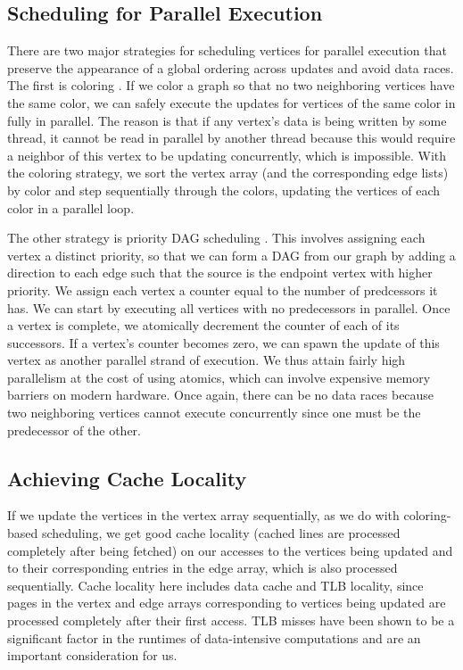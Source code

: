 \documentclass[journal]{IEEEtran}
\begin{document}
\subsection{Scheduling for Parallel Execution}
There are two major strategies for scheduling vertices for parallel execution that preserve the appearance of a global ordering across updates and avoid data races. The first is coloring \cite{chromatic}. If we color a graph so that no two neighboring vertices have the same color, we can safely execute the updates for vertices of the same color in fully in parallel. The reason is that if any vertex's data is being written by some thread, it cannot be read in parallel by another thread because this would require a neighbor of this vertex to be updating concurrently, which is impossible. With the coloring strategy, we sort the vertex array (and the corresponding edge lists) by color and step sequentially through the colors, updating the vertices of each color in a parallel loop.

The other strategy is priority DAG scheduling \cite{dag}. This involves assigning each vertex a distinct priority, so that we can form a DAG from our graph by adding a direction to each edge such that the source is the endpoint vertex with higher priority. We assign each vertex a counter equal to the number of predcessors it has. We can start by executing all vertices with no predecessors in parallel. Once a vertex is complete, we atomically decrement the counter of each of its successors. If a vertex's counter becomes zero, we can spawn the update of this vertex as another parallel strand of execution. We thus attain fairly high parallelism at the cost of using atomics, which can involve expensive memory barriers on modern hardware. Once again, there can be no data races because two neighboring vertices cannot execute concurrently since one must be the predecessor of the other.

\subsection{Achieving Cache Locality}
If we update the vertices in the vertex array sequentially, as we do with coloring-based scheduling, we get good cache locality (cached lines are processed completely after being fetched) on our accesses to the vertices being updated and to their corresponding entries in the edge array, which is also processed sequentially. Cache locality here includes data cache and TLB locality, since pages in the vertex and edge arrays corresponding to vertices being updated are processed completely after their first access. TLB misses have been shown to be a significant factor in the runtimes of data-intensive computations and are an important consideration for us.
\end{document}
